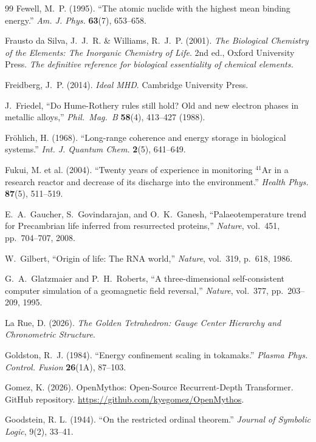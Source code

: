 \documentclass[12pt,oneside]{book}
\theoremstyle{principia}
\theoremstyle{definition}
\theoremstyle{remark}
\begin{document}
\begin{thebibliography}{99}
Fewell, M.~P. (1995).
``The atomic nuclide with the highest mean binding energy.''
\textit{Am. J. Phys.} \textbf{63}(7), 653--658.

Frausto da Silva, J.~J.~R. \& Williams, R.~J.~P. (2001).
\textit{The Biological Chemistry of the Elements: The Inorganic Chemistry of Life}.
2nd ed., Oxford University Press.
\textit{The definitive reference for biological essentiality of chemical elements.}

Freidberg, J.~P. (2014).
\textit{Ideal MHD}. Cambridge University Press.

J.~Friedel,
``Do Hume-Rothery rules still hold? Old and new electron phases in metallic alloys,''
\emph{Phil.~Mag.~B} \textbf{58}(4), 413--427 (1988).

Fr\"ohlich, H. (1968).
``Long-range coherence and energy storage in biological systems.''
\textit{Int. J. Quantum Chem.} \textbf{2}(5), 641--649.

Fukui, M. et al. (2004).
``Twenty years of experience in monitoring ${}^{41}$Ar in a research reactor and decrease of its discharge into the environment.''
\textit{Health Phys.} \textbf{87}(5), 511--519.

E.~A.~Gaucher, S.~Govindarajan, and O.~K.~Ganesh,
``Palaeotemperature trend for Precambrian life inferred from resurrected proteins,''
\emph{Nature}, vol.~451, pp.~704--707, 2008.

W.~Gilbert,
``Origin of life: The RNA world,''
\emph{Nature}, vol.~319, p.~618, 1986.

G.~A.~Glatzmaier and P.~H.~Roberts,
``A three-dimensional self-consistent computer simulation of a geomagnetic field reversal,''
\emph{Nature}, vol.~377, pp.~203--209, 1995.

La Rue, D. (2026).
\textit{The Golden Tetrahedron: Gauge Center Hierarchy and Chronometric Structure}.

Goldston, R.~J. (1984).
``Energy confinement scaling in tokamaks.''
\textit{Plasma Phys. Control. Fusion} \textbf{26}(1A), 87--103.

Gomez, K. (2026).
OpenMythos: Open-Source Recurrent-Depth Transformer.
GitHub repository. \url{https://github.com/kyegomez/OpenMythos}.

Goodstein, R. L. (1944).
``On the restricted ordinal theorem.''
\textit{Journal of Symbolic Logic}, 9(2), 33--41.


\end{thebibliography}
\end{document}
